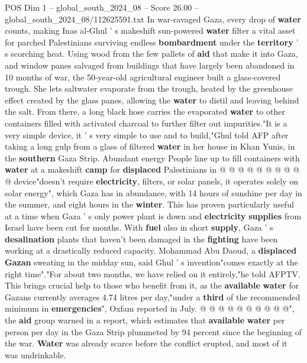 \begin{textsample}{POS Dim 1 – global\_south\_2024\_08 – Score 26.00 – global\_south\_2024\_08/112625591.txt}  \label{ex:f1_pos_329}
In war-ravaged Gaza, every drop of \textbf{water} counts, making Inas al-Ghul ' s makeshift sun-powered \textbf{water} filter a vital asset for parched Palestinians surviving endless \textbf{bombardment} under the \textbf{territory} ' s scorching heat.
Using wood from the few pallets of \textbf{aid} that make it into Gaza, and window panes salvaged from buildings that have largely been abandoned in 10 months of war, the 50-year-old agricultural engineer built a glass-covered trough.
She lets saltwater evaporate from the trough, heated by the greenhouse effect created by the glass panes, allowing the \textbf{water} to distil and leaving behind the salt.
From there, a long black hose carries the evaporated \textbf{water} to other containers filled with activated charcoal to further filter out impurities."It is a very simple device, it ' s very simple to use and to build,"Ghul told AFP after taking a long gulp from a glass of filtered \textbf{water} in her house in Khan Yunis, in the \textbf{southern} Gaza Strip.
Abundant energy People line up to fill containers with \textbf{water} at a makeshift \textbf{camp} for \textbf{displaced} Palestinians in @ @ @ @ @ @ @ @ @ @ device"doesn't require \textbf{electricity}, filters, or solar panels, it operates solely on solar energy", which Gaza has in abundance, with 14 hours of sunshine per day in the summer, and eight hours in the \textbf{winter}.
This has proven particularly useful at a time when Gaza ' s only power plant is down and \textbf{electricity} \textbf{supplies} from Israel have been cut for months.
With \textbf{fuel} also in short \textbf{supply}, Gaza ' s \textbf{desalination} plants that haven't been damaged in the \textbf{fighting} have been working at a drastically reduced capacity.
Mohammad Abu Daoud, a \textbf{displaced} \textbf{Gazan} sweating in the midday sun, said Ghul ' s invention"comes exactly at the right time"."For about two months, we have relied on it entirely,"he told AFPTV.
This brings crucial help to those who benefit from it, as the \textbf{available} \textbf{water} for Gazans currently averages 4.74 litres per day,"under a \textbf{third} of the recommended minimum in \textbf{emergencies}", Oxfam reported in July. @ @ @ @ @ @ @ @ @ @", the \textbf{aid} group warned in a report, which estimates that \textbf{available} \textbf{water} per person per day in the Gaza Strip plummeted by 94 percent since the beginning of the war. \textbf{Water} was already scarce before the conflict erupted, and most of it was undrinkable.

\end{textsample}
